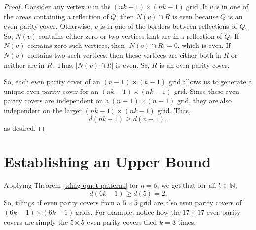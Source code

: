 \documentclass[a4paper]{article}
\newcommand{\N}{\mathbb{N}}
\newcommand{\abs}[1]{\left| #1 \right|}
\begin{document}
\begin{proof}
		Consider any vertex $v$ in the $(nk-1) \times (nk-1)$ grid.
		If $v$ is in one of the areas containing a reflection of $Q$, then $N(v) \cap R$ is even because $Q$ is an even parity cover.
		Otherwise, $v$ is in one of the borders between reflections of $Q$.
		So, $N(v)$ contains either zero or two vertices that are in a reflection of $Q$.
		If $N(v)$ contains zero such vertices, then $\abs{N(v) \cap R} = 0$, which is even.
		If $N(v)$ contains two such vertices, then these vertices are either both in $R$ or neither are in $R$.
		Thus, $\abs{N(v) \cap R}$ is even.
		So, $R$ is an even parity cover.
		
		So, each even parity cover of an $(n-1) \times (n-1)$ grid allows us to generate a unique even parity cover for an $(nk-1) \times (nk-1)$ grid.
		Since these even parity covers are independent on a $(n-1) \times (n-1)$ grid, they are also independent on the larger $(nk-1) \times (nk-1)$ grid.
		Thus,
		\begin{equation*}
			d(nk-1) \geq d(n-1),
		\end{equation*}
		as desired.
	\end{proof}

	\section{Establishing an Upper Bound}
	Applying Theorem \ref{tiling-quiet-patterns} for $n=6$, we get that for all $k \in \N$,
	\begin{equation*}
		d(6k - 1) \geq d(5) = 2.
	\end{equation*}
	So, tilings of even parity covers from a $5 \times 5$ grid are also even parity covers of $(6k-1) \times (6k-1)$ grids.
	For example, notice how the $17 \times 17$ even parity covers are simply the $5 \times 5$ even parity covers tiled $k=3$ times.
	
\end{document}
